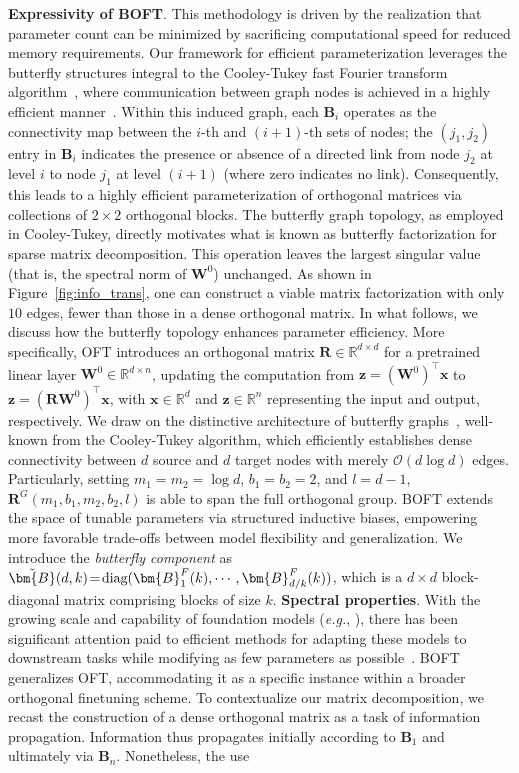 \textbf{Expressivity of BOFT}. This methodology is driven by the realization that parameter count can be minimized by sacrificing computational speed for reduced memory requirements. Our framework for efficient parameterization leverages the butterfly structures integral to the Cooley-Tukey fast Fourier transform algorithm~\cite{cooley1965algorithm}, where communication between graph nodes is achieved in a highly efficient manner~\cite{klasing1994broadcasting}. Within this induced graph, each $\bm{B}_i$ operates as the connectivity map between the $i$-th and $(i+1)$-th sets of nodes; the $(j_1,j_2)$ entry in $\bm{B}_i$ indicates the presence or absence of a directed link from node $j_2$ at level $i$ to node $j_1$ at level $(i+1)$ (where zero indicates no link). Consequently, this leads to a highly efficient parameterization of orthogonal matrices via collections of $2\times 2$ orthogonal blocks. The butterfly graph topology, as employed in Cooley-Tukey, directly motivates what is known as butterfly factorization for sparse matrix decomposition. This operation leaves the largest singular value (that is, the spectral norm of $\bm{W}^0$) unchanged. As shown in Figure~\ref{fig:info_trans}, one can construct a viable matrix factorization with only $10$ edges, fewer than those in a dense orthogonal matrix. In what follows, we discuss how the butterfly topology enhances parameter efficiency. More specifically, OFT introduces an orthogonal matrix $\bm{R}\in\mathbb{R}^{d\times d}$ for a pretrained linear layer $\bm{W}^0\in\mathbb{R}^{d\times n}$, updating the computation from $\bm{z}=(\bm{W}^0)^\top\bm{x}$ to $\bm{z}=(\bm{R}\bm{W}^0)^\top\bm{x}$, with $\bm{x}\in\mathbb{R}^{d}$ and $\bm{z}\in\mathbb{R}^{n}$ representing the input and output, respectively. We draw on the distinctive architecture of butterfly graphs~\cite{cooley1965algorithm}, well-known from the Cooley-Tukey algorithm, which efficiently establishes dense connectivity between $d$ source and $d$ target nodes with merely $\mathcal{O}(d\log d)$ edges. Particularly, setting $m_1=m_2=\log d$, $b_1=b_2=2$, and $l=d-1$, $\bm{R}^G(m_1,b_1,m_2,b_2,l)$ is able to span the full orthogonal group. BOFT extends the space of tunable parameters via structured inductive biases, empowering more favorable trade-offs between model flexibility and generalization. We introduce the \emph{butterfly component} as $\thickmuskip=2mu \medmuskip=2mu \tilde{\bm{B}}(d,k)=\text{diag}(\bm{B}^F_1(k),\cdots,\bm{B}^F_{d/k}(k))$, which is a $d\times d$ block-diagonal matrix comprising blocks of size $k$. \textbf{Spectral properties}. With the growing scale and capability of foundation models (\emph{e.g.}, \cite{brown2020language,radford2021learning,rombach2022high,kirillov2023segment}), there has been significant attention paid to efficient methods for adapting these models to downstream tasks while modifying as few parameters as possible~\cite{treviso2023efficient,ding2023parameter,lialin2023scaling}. BOFT generalizes OFT, accommodating it as a specific instance within a broader orthogonal finetuning scheme. To contextualize our matrix decomposition, we recast the construction of a dense orthogonal matrix as a task of information propagation. Information thus propagates initially according to $\bm{B}_1$ and ultimately via $\bm{B}_n$. Nonetheless, the use 
